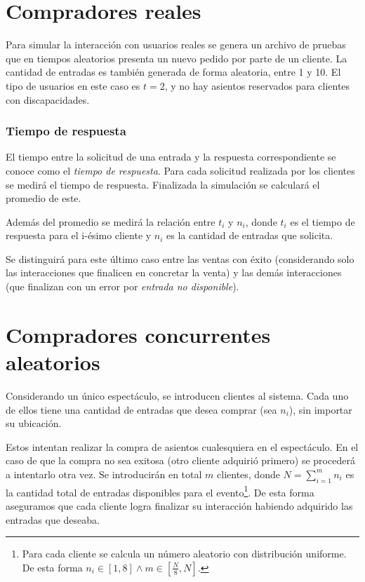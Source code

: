 \section{Compradores reales}

Para simular la interacción con usuarios reales se genera un archivo de pruebas que en tiempos aleatorios
presenta un nuevo pedido por parte de un cliente.
La cantidad de entradas es también generada de forma aleatoria, entre 1 y 10.
El tipo de usuarios en este caso es \(t=2\), y no hay asientos reservados para clientes con discapacidades.

\subsubsection{Tiempo de respuesta}
El tiempo entre la solicitud de una entrada y la respuesta correspondiente se conoce como el \emph{tiempo de respuesta}.
Para cada solicitud realizada por los clientes se medirá el tiempo de respuesta.
Finalizada la simulación se calculará el promedio de este.

Además del promedio se medirá la relación entre \(t_i\) y \(n_i\), donde \(t_i\) es el tiempo de respuesta para el i-ésimo
cliente y \(n_i\) es la cantidad de entradas que solicita.

Se distinguirá para este último caso entre las ventas con éxito (considerando solo las interacciones que finalicen en concretar la venta)
y las demás interacciones (que finalizan con un error por \emph{entrada no disponible}).

\section{Compradores concurrentes aleatorios} \label{escenario-tiempoespera}
Considerando un único espectáculo, se introducen clientes al sistema.
Cada uno de ellos tiene una cantidad de entradas que desea comprar
(sea \(n_i\)), sin importar su ubicación.

Estos intentan realizar la compra de asientos cualesquiera en el espectáculo.
En el caso de que la compra no sea exitosa (otro cliente adquirió primero) se procederá a intentarlo otra vez.
Se introducirán en total \(m\) clientes, donde \(N = \sum_{i=1}^{m} n_i\)
es la cantidad total de entradas disponibles para el evento\footnote{
	Para cada cliente se calcula un número aleatorio con distribución uniforme.
	De esta forma 
	\(n_i \in [1, 8] \wedge m \in [\frac{N}{8}, N]\).
}.
De esta forma aseguramos que cada cliente logra finalizar su interacción habiendo adquirido las entradas que deseaba.

